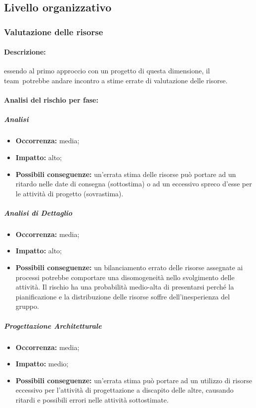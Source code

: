 \documentclass[../PianoProgetto.tex]{subfiles}
\begin{document}
\newpage
\subsection{Livello organizzativo}

\subsubsection{Valutazione delle risorse}
\label{sec:Valutazione delle risorse}

	\paragraph*{Descrizione:} essendo al primo approccio con un progetto di questa dimensione, il team\g\ potrebbe andare incontro a stime errate di valutazione delle risorse.
	
	\paragraph*{Analisi del rischio per fase:} 

		\subparagraph*{Analisi}
			\begin{itemize}[label={-}]
				\item \textbf{Occorrenza:} media;
				\item \textbf{Impatto:} alto;
				\item \textbf{Possibili conseguenze:} un'errata stima delle risorse può portare ad un ritardo nelle date di consegna (sottostima) o ad un eccessivo spreco d'esse per le attività di progetto (sovrastima).
			\end{itemize}
			
		\subparagraph*{Analisi di Dettaglio}
			\begin{itemize}[label={-}]
				\item \textbf{Occorrenza:} media;
				\item \textbf{Impatto:} alto;
				\item \textbf{Possibili conseguenze:} un bilanciamento errato delle risorse assegnate ai processi potrebbe comportare una disomogeneità nello svolgimento delle attività. Il rischio ha una probabilità medio-alta di presentarsi perché la pianificazione e la distribuzione delle risorse soffre dell'inesperienza del gruppo.
			\end{itemize}
			
		\subparagraph*{Progettazione Architetturale}
			\begin{itemize}[label={-}]
				\item \textbf{Occorrenza:} media;
				\item \textbf{Impatto:} medio;
				\item \textbf{Possibili conseguenze:} un'errata stima può portare ad un utilizzo di risorse eccessivo per l'attività di progettazione a discapito delle altre, causando ritardi e possibili errori nelle attività sottostimate.
			\end{itemize}
			
\end{document}
